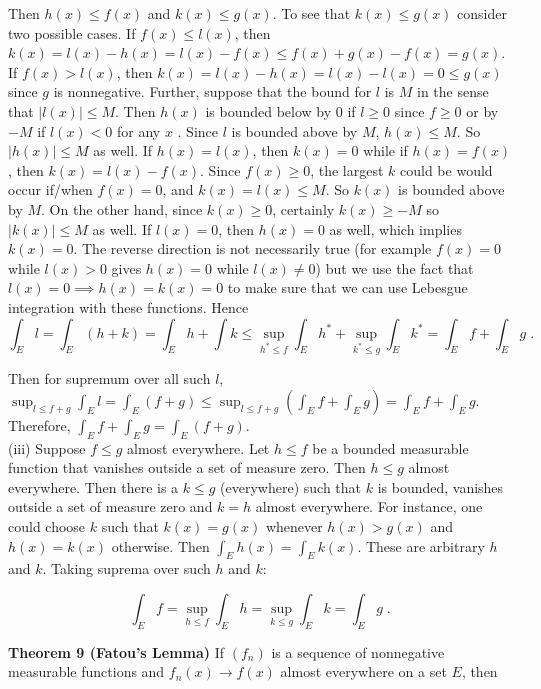 \documentclass[a4paper]{article}
\begin{document}
Then $h(x) \leq f(x)$ and $k(x) \leq g(x)$. To see that $k(x) \leq g(x)$ consider two possible cases. If $f(x) \leq l(x)$, then $k(x) = l(x) - h(x) = l(x) - f(x) \leq f(x) + g(x) - f(x) = g(x)$. If $f(x) > l(x)$, then $k(x) = l(x) - h(x) = l(x) - l(x) = 0 \leq g(x)$ since $g$ is nonnegative. Further, suppose that the bound for $l$ is $M$ in the sense that $|l(x)| \leq M$. Then $h(x)$ is bounded below by 0 if $l \geq 0$ since $f\geq 0 $ or by $-M$ if $l(x) < 0$ for any $x$ . Since $l$ is bounded above by $M$, $h(x) \leq M$. So $|h(x)| \leq M$ as well. If $h(x) = l(x)$, then $k(x) = 0$ while if $h(x) = f(x)$, then $k(x) = l(x) - f(x)$. Since $f(x) \geq 0$, the largest $k$ could be would occur if/when $f(x) = 0$, and $k(x) = l(x) \leq M$. So $k(x)$ is bounded above by $M$. On the other hand, since $k(x) \geq 0$, certainly $k(x) \geq -M$ so $|k(x)| \leq M$ as well. If $l(x) = 0$, then $h(x) = 0$ as well, which implies $k(x) = 0$. The reverse direction is not necessarily true (for example $f(x) = 0$ while $l(x) > 0$ gives $h(x) = 0$ while $l(x) \neq 0$) but we use the fact that $l(x) = 0 \implies h(x) = k(x) = 0$ to make sure that we can use Lebesgue integration with these functions. Hence $$\int_E l = \int_E (h+k) = \int_E h + \int k \leq \sup_{h^* \leq f} \int_E h^* + \sup_{k^* \leq g} \int_E k^* = \int_E f + \int_E g \;.$$ 

Then for supremum over all such $l$, $\sup_{l \leq f+g} \int_E l = \int_E (f+g) \leq \sup_{l\leq f+g} \left(\int_E f + \int_E g \right) = \int_E f + \int_E g$. \\

Therefore, $\int_E f + \int_E g = \int_E (f+g)$. \\

(iii) Suppose $f\leq g$ almost everywhere. Let $h \leq f$ be a bounded measurable function that vanishes outside a set of measure zero. Then $h\leq g$ almost everywhere. Then there is a $k \leq g$ (everywhere) such that $k$ is bounded, vanishes outside a set of measure zero and $k = h$ almost everywhere. For instance, one could choose $k$ such that $k(x) = g(x)$ whenever $h(x) > g(x)$ and $h(x) = k(x)$ otherwise. Then $\int_E h(x) = \int_E k(x)$. These are arbitrary $h$ and $k$. Taking suprema over such $h$ and $k$:

$$\int_E f = \sup_{h \leq f} \int_E h = \sup_{k \leq g} \int_E k = \int_E g \;.$$

{\bf Theorem 9 (Fatou's Lemma)} If $(f_n)$ is a sequence of nonnegative measurable functions and $f_n(x) \rightarrow f(x)$ almost everywhere on a set $E$, then
\end{document}
